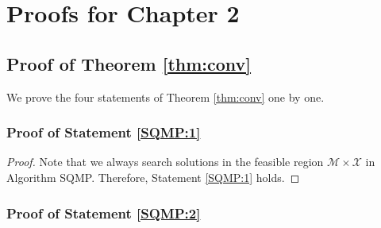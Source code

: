 \chapter{Proofs for Chapter 2}\label{c2:appendix}

\section{Proof of Theorem \ref{thm:conv}}

We prove the four statements of Theorem \ref{thm:conv} one by one.

\subsection{Proof of Statement \ref{SQMP:1}}

\begin{proof}
Note that we always search solutions in the feasible region
$\mathcal{M}\times \mathcal{X}$ in Algorithm SQMP. Therefore,
Statement \ref{SQMP:1} holds.
\end{proof}


\subsection{Proof of Statement \ref{SQMP:2}}

